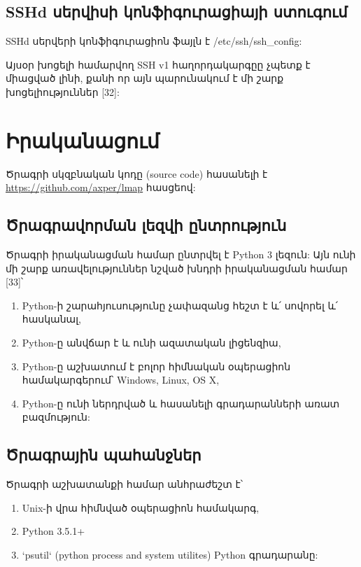 \documentclass[a4paper,12pt]{article}
\begin{document}
\begin{sloppypar}


\subsection{SSHd սերվիսի կոնֆիգուրացիայի ստուգում}


SSHd սերվերի կոնֆիգուրացիոն ֆայլն է /etc/ssh/ssh\_config:

Այսօր խոցելի համարվող SSH v1 հաղորդակարգըը չպետք է միացված լինի, քանի
որ այն պարունակում է մի շարք խոցելիություններ [32]:


\section{Իրականացում}


Ծրագրի սկզբնական կոդը (source code) հասանելի է \url{https://github.com/axper/lmap} հասցեով:


\subsection{Ծրագրավորման լեզվի ընտրություն}


Ծրագրի իրականացման համար ընտրվել է Python 3 լեզուն:
Այն ունի մի շարք առավելություններ նշված խնդրի իրականացման համար [33]՝

\begin{enumerate}
\item Python-ի շարահյուսությունը չափազանց հեշտ է և՛ սովորել և՛ հասկանալ,
\item Python-ը անվճար է և ունի ազատական լիցենզիա,
\item Python-ը աշխատում է բոլոր հիմնական օպերացիոն համակարգերում՝ Windows, Linux, OS X,
\item Python-ը ունի ներդրված և հասանելի գրադարանների առատ բազմություն:
\end{enumerate}


\subsection{Ծրագրային պահանջներ}

Ծրագրի աշխատանքի համար անհրաժեշտ է՝

\begin{enumerate}
\item Unix-ի վրա հիմնված օպերացիոն համակարգ,
\item Python 3.5.1+
\item `psutil` (python process and system utilites) Python գրադարանը:
\end{enumerate}


\end{sloppypar}
\end{document}

